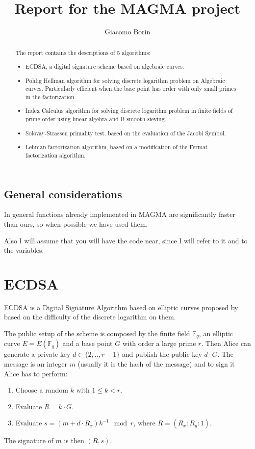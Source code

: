 \documentclass{article}
\title{Report for the MAGMA project}
\author{Giacomo Borin}
\newcommand{\F}{\mathbb{F}}
\theoremstyle{plain}
\theoremstyle{remark}
\theoremstyle{definition}
\begin{document}
\maketitle

\begin{abstract}
	The report contains the descriptions of 5 algorithms:
	\begin{itemize}
		\item ECDSA, a digital signature scheme based on algebraic curves.
		\item Pohlig Hellman algorithm for solving discrete logarithm problem on Algebraic curves. Particularly efficient when the base point has order with only small primes in the factorization
		\item Index Calculus algorithm for solving discrete logarithm problem in finite fields of prime order using linear algebra and B-smooth sieving.
		\item Solovay-Strassen primality test, based on the evaluation of the Jacobi Symbol.
		\item Lehman factorization algorithm, based on a modification of the Fermat factorization algorithm.
	\end{itemize}


\end{abstract}

\subsection*{General considerations}

In general functions already implemented in MAGMA are significantly faster than ours, so when possible we have used them. 

Also I will assume that you will have the code near, since I will refer to it and to the variables.


\section{ECDSA}

ECDSA is a Digital Signature Algorithm based on elliptic curves proposed by \cite{ECDSA} based on the difficulty of the discrete logarithm on them. 

The public setup of the scheme is composed by the finite field $\F_q$, an elliptic curve $E = E(\F_q)$ and a base point $G$ with order a large prime $r$. Then Alice can generate a private key $d\in \{2,..,r-1\}$ and publish the public key $d\cdot G$. The message is an integer $m$ (usually it is the hash of the message) and to sign it Alice has to perform:
\begin{enumerate}
	\item Choose a random $k$ with $1 \leq k < r$.
	\item Evaluate $R = k \cdot G$.
	\item Evaluate $ s = (m + d\cdot R_x) k^{-1} \mod r$, where $R = (R_x : R_y : 1)$.
\end{enumerate}
The signature of $m$ is then $(R,s)$.
\end{document}
